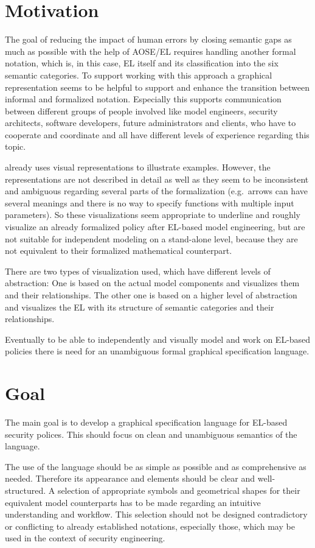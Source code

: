 \documentclass[12pt,a4paper]{article}
\begin{document}
\section{Motivation} 
The goal of reducing the impact of human errors by closing semantic gaps as much as possible with the help of AOSE/EL requires handling another formal notation, which is, in this case, EL itself and its classification into the six semantic categories.
To support working with this approach a graphical representation seems to be helpful to support and enhance the transition between informal and formalized notation.
Especially this supports communication between different groups of people involved like model engineers, security architects, software developers, future administrators and clients, who have to cooperate and coordinate and all have different levels of experience regarding this topic.

\cite{Amthor18} already uses visual representations to illustrate examples.
However, the representations are not described in detail as well as they seem to be inconsistent and ambiguous regarding several parts of the formalization (e.g.\ arrows can have several meanings and there is no way to specify functions with multiple input parameters).
So these visualizations seem appropriate to underline and roughly visualize an already formalized policy after EL-based model engineering, but are not suitable for independent modeling on a stand-alone level, because they are not equivalent to their formalized mathematical counterpart.

There are two types of visualization \cite{Amthor18} used, which have different levels of abstraction: 
One is based on the actual model components and visualizes them and their relationships.
The other one is based on a higher level of abstraction and visualizes the EL with its structure of semantic categories and their relationships.

Eventually to be able to independently and visually model and work on EL-based policies there is need for an unambiguous formal graphical specification language.


\section{Goal} 
The main goal is to develop a graphical specification language for EL-based security polices.
This should focus on clean and unambiguous semantics of the language.

The use of the language should be as simple as possible and as comprehensive as needed.
Therefore its appearance and elements should be clear and well-structured.
A selection of appropriate symbols and geometrical shapes for their equivalent model counterparts has to be made regarding an intuitive understanding and workflow.
This selection should not be designed contradictory or conflicting to already established notations, especially those, which may be used in the context of security engineering.
\end{document}
